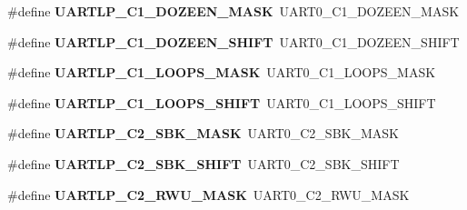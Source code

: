 \begin{DoxyCompactItemize}
\item 
\hypertarget{group___backward___compatibility___symbols_gaa700bb55bfafb472644d0616a9488c97}{}\#define {\bfseries U\+A\+R\+T\+L\+P\+\_\+\+C1\+\_\+\+D\+O\+Z\+E\+E\+N\+\_\+\+M\+A\+S\+K}~U\+A\+R\+T0\+\_\+\+C1\+\_\+\+D\+O\+Z\+E\+E\+N\+\_\+\+M\+A\+S\+K\label{group___backward___compatibility___symbols_gaa700bb55bfafb472644d0616a9488c97}

\item 
\hypertarget{group___backward___compatibility___symbols_ga643a9b2d4426aa5f6cd371cf81b95404}{}\#define {\bfseries U\+A\+R\+T\+L\+P\+\_\+\+C1\+\_\+\+D\+O\+Z\+E\+E\+N\+\_\+\+S\+H\+I\+F\+T}~U\+A\+R\+T0\+\_\+\+C1\+\_\+\+D\+O\+Z\+E\+E\+N\+\_\+\+S\+H\+I\+F\+T\label{group___backward___compatibility___symbols_ga643a9b2d4426aa5f6cd371cf81b95404}

\item 
\hypertarget{group___backward___compatibility___symbols_gabf6750c9bbd5add41b650fcb0e2f3cc9}{}\#define {\bfseries U\+A\+R\+T\+L\+P\+\_\+\+C1\+\_\+\+L\+O\+O\+P\+S\+\_\+\+M\+A\+S\+K}~U\+A\+R\+T0\+\_\+\+C1\+\_\+\+L\+O\+O\+P\+S\+\_\+\+M\+A\+S\+K\label{group___backward___compatibility___symbols_gabf6750c9bbd5add41b650fcb0e2f3cc9}

\item 
\hypertarget{group___backward___compatibility___symbols_ga15b68685a3a0931d93b4848953390d10}{}\#define {\bfseries U\+A\+R\+T\+L\+P\+\_\+\+C1\+\_\+\+L\+O\+O\+P\+S\+\_\+\+S\+H\+I\+F\+T}~U\+A\+R\+T0\+\_\+\+C1\+\_\+\+L\+O\+O\+P\+S\+\_\+\+S\+H\+I\+F\+T\label{group___backward___compatibility___symbols_ga15b68685a3a0931d93b4848953390d10}

\item 
\hypertarget{group___backward___compatibility___symbols_ga6eae1bd3ccd0ddc022e4b25e685cdcd5}{}\#define {\bfseries U\+A\+R\+T\+L\+P\+\_\+\+C2\+\_\+\+S\+B\+K\+\_\+\+M\+A\+S\+K}~U\+A\+R\+T0\+\_\+\+C2\+\_\+\+S\+B\+K\+\_\+\+M\+A\+S\+K\label{group___backward___compatibility___symbols_ga6eae1bd3ccd0ddc022e4b25e685cdcd5}

\item 
\hypertarget{group___backward___compatibility___symbols_ga7753cf443cbaa9e904cbd69211913709}{}\#define {\bfseries U\+A\+R\+T\+L\+P\+\_\+\+C2\+\_\+\+S\+B\+K\+\_\+\+S\+H\+I\+F\+T}~U\+A\+R\+T0\+\_\+\+C2\+\_\+\+S\+B\+K\+\_\+\+S\+H\+I\+F\+T\label{group___backward___compatibility___symbols_ga7753cf443cbaa9e904cbd69211913709}

\item 
\hypertarget{group___backward___compatibility___symbols_ga23425daa820ed95ebe0509a11b31712a}{}\#define {\bfseries U\+A\+R\+T\+L\+P\+\_\+\+C2\+\_\+\+R\+W\+U\+\_\+\+M\+A\+S\+K}~U\+A\+R\+T0\+\_\+\+C2\+\_\+\+R\+W\+U\+\_\+\+M\+A\+S\+K\label{group___backward___compatibility___symbols_ga23425daa820ed95ebe0509a11b31712a}


\end{DoxyCompactItemize}
